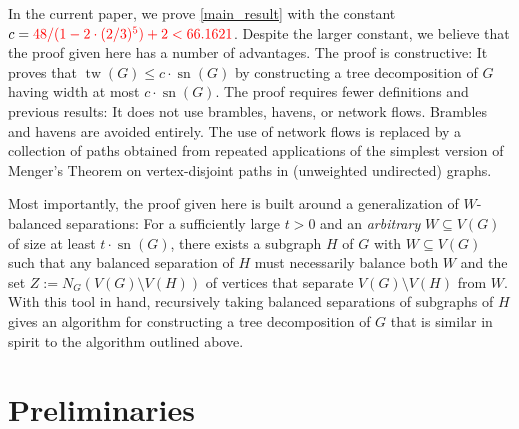 \documentclass{patmorin}
\DeclareMathOperator{\sep}{sn}
\DeclareMathOperator{\tw}{tw}
\begin{document}
In the current paper, we prove \cref{main_result} with the constant $c=\mathcolor{red}{48/(1-2\cdot(2/3)^5)+2< 66.1621}$.  Despite the larger constant, we believe that the proof given here has a number of advantages.  The proof is constructive: It proves that $\tw(G)\le c\cdot \sep(G)$ by constructing a tree decomposition of $G$ having width at most $c\cdot\sep(G)$.  The proof requires fewer definitions and previous results: It does not use brambles, havens, or network flows.  Brambles and havens are avoided entirely.  The use of network flows is replaced by a collection of paths obtained from repeated applications of the simplest version of Menger's Theorem on vertex-disjoint paths in (unweighted undirected) graphs.

Most importantly, the proof given here is built around a generalization of $W$-balanced separations:  For a sufficiently large $t>0$ and an \emph{arbitrary} $W\subseteq V(G)$ of size at least $t\cdot \sep(G)$, there exists a subgraph $H$ of $G$ with $W\subseteq V(G)$ such that any balanced separation of $H$ must necessarily balance both $W$ and the set $Z:=N_G(V(G)\setminus V(H))$ of vertices that separate $V(G)\setminus V(H)$ from $W$. With this tool in hand, recursively taking balanced separations of subgraphs of $H$ gives an algorithm for constructing a tree decomposition of $G$ that is similar in spirit to the algorithm outlined above.


\section{Preliminaries}
\end{document}
